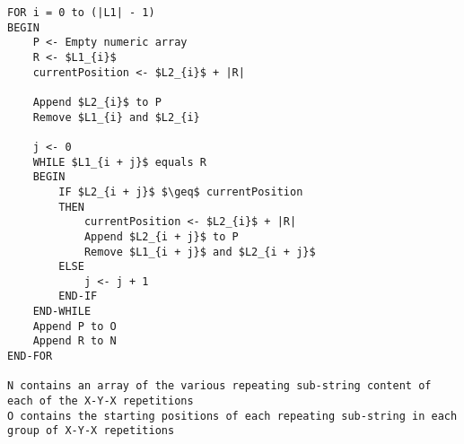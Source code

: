 \documentclass[12pt]{article}
\begin{document}
\begin{flushleft}
\begin{lstlisting}
FOR i = 0 to (|L1| - 1)
BEGIN
	P <- Empty numeric array
	R <- $L1_{i}$
	currentPosition <- $L2_{i}$ + |R|
	
	Append $L2_{i}$ to P	
	Remove $L1_{i} and $L2_{i}	
	
	j <- 0		
	WHILE $L1_{i + j}$ equals R
	BEGIN
		IF $L2_{i + j}$ $\geq$ currentPosition
		THEN 
			currentPosition <- $L2_{i}$ + |R|
			Append $L2_{i + j}$ to P
			Remove $L1_{i + j}$ and $L2_{i + j}$			
		ELSE
			j <- j + 1
		END-IF		
	END-WHILE
	Append P to O
	Append R to N  
END-FOR

N contains an array of the various repeating sub-string content of each of the X-Y-X repetitions
O contains the starting positions of each repeating sub-string in each group of X-Y-X repetitions 
\end{lstlisting} 
\end{flushleft}
\end{document}
